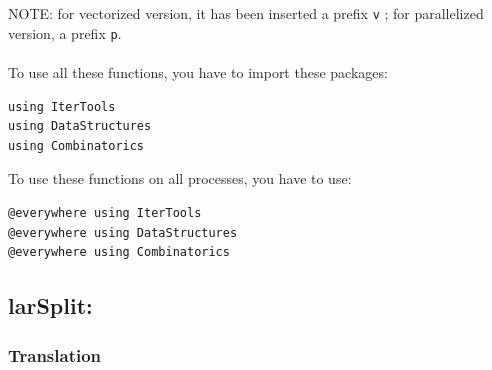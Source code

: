 \documentclass{article}
\begin{document}
\\ \\
NOTE: for vectorized version, it has been inserted a prefix \texttt{v} ; for parallelized version, a prefix \texttt{p}.
\\ \\
To use all these functions, you have to import these packages:
\begin{flushleft}\small
\begin{list}{}{} \item
\begin{Verbatim}
using IterTools
using DataStructures
using Combinatorics
\end{Verbatim}
\end{list}
\end{flushleft}
\vspace{1ex}
To use these functions on all processes, you have to use:
\begin{flushleft}\small
\begin{list}{}{} \item
\begin{Verbatim}
@everywhere using IterTools
@everywhere using DataStructures
@everywhere using Combinatorics
\end{Verbatim}
\end{list}
\end{flushleft}



\subsection{larSplit:}

\subsubsection{Translation}
\end{document}
